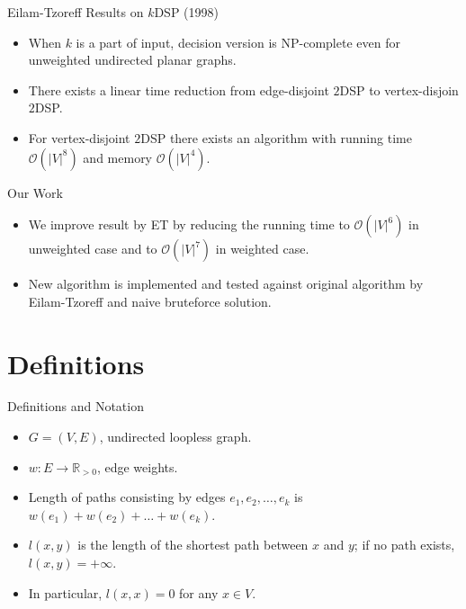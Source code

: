 \documentclass{beamer}
\newcommand{\OO}{\mathcal{O}}
\newcommand{\RR}{\mathbb{R}}
\begin{document}
\begin{frame}{Eilam-Tzoreff Results on $k$DSP \cite{ET} (1998)}
    \begin{itemize}
        \item When $k$ is a part of input, decision version is NP-complete even for unweighted undirected planar graphs.
        \item There exists a linear time reduction from edge-disjoint $2$DSP to vertex-disjoin $2$DSP.
        \item For vertex-disjoint $2$DSP there exists an algorithm with running time $\OO(|V|^8)$ and memory $\OO(|V|^4)$.
    \end{itemize}
\end{frame}

\begin{frame}{Our Work}
    \begin{itemize}
        \item We improve result by ET by reducing the running time to $\OO(|V|^6)$ in unweighted case and to $\OO(|V|^7)$ in weighted case.
        \item New algorithm is implemented and tested against original algorithm by Eilam-Tzoreff and naive bruteforce solution.
    \end{itemize}
\end{frame}

\section{Definitions}

\begin{frame}{Definitions and Notation}
    \begin{itemize}
        \item $G = (V, E)$, undirected loopless graph.
        \item $w: E \rightarrow \RR_{>0}$, edge weights.
        \item Length of paths consisting by edges $e_1, e_2, \ldots, e_k$ is $w(e_1) + w(e_2) + \ldots + w(e_k)$.
        \item $l(x, y)$ is the length of the shortest path between $x$ and $y$; if no path exists, $l(x, y) = +\infty$.
        \item In particular, $l(x, x) = 0$ for any $x \in V$.
    \end{itemize}
\end{frame}
\end{document}
